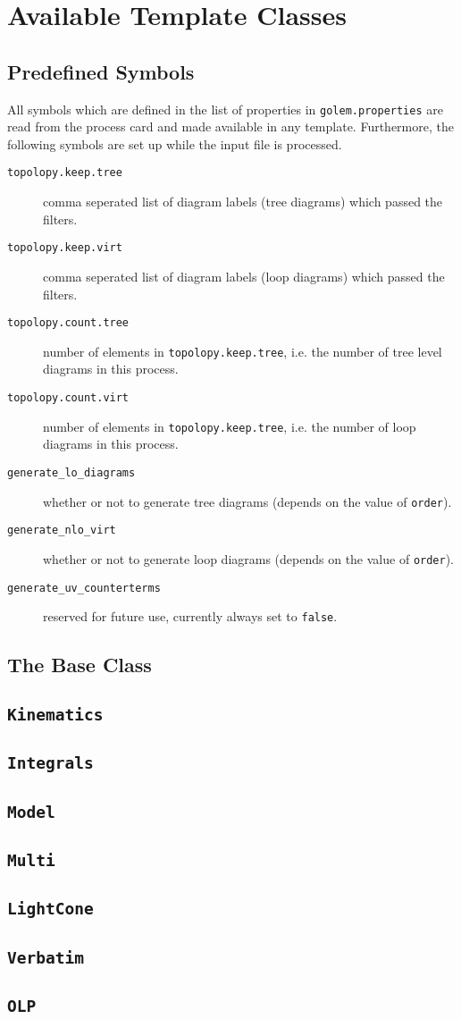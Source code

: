 \documentclass[11pt,a4paper]{refrep}
\begin{document}
\appendix
\chapter{Available Template Classes}
\section{Predefined Symbols}
All symbols which are defined in the list of properties
in \texttt{golem.properties} are read from the process card and
made available in any template. Furthermore, the following symbols
are set up while the input file is processed.
\begin{description}
\item[\texttt{topolopy.keep.tree}] comma seperated list of diagram labels
(tree diagrams) which passed the filters.
\item[\texttt{topolopy.keep.virt}] comma seperated list of diagram labels
(loop diagrams) which passed the filters.
\item[\texttt{topolopy.count.tree}] number of elements in
\texttt{topolopy.keep.tree}, i.e. the number of tree level diagrams in this
process.
\item[\texttt{topolopy.count.virt}] number of elements in
\texttt{topolopy.keep.tree}, i.e. the number of loop diagrams in this
process.
\item[\texttt{generate\_lo\_diagrams}] whether or not to generate tree
diagrams (depends on the value of \texttt{order}).
\item[\texttt{generate\_nlo\_virt}] whether or not to generate loop
diagrams (depends on the value of \texttt{order}).
\item[\texttt{generate\_uv\_counterterms}] reserved for future use,
currently always set to \texttt{false}.
\end{description}

\section{The Base Class}
\section{\texttt{Kinematics}}
\section{\texttt{Integrals}}
\section{\texttt{Model}}
\section{\texttt{Multi}}
\section{\texttt{LightCone}}
\section{\texttt{Verbatim}}
\section{\texttt{OLP}}
\end{document}
